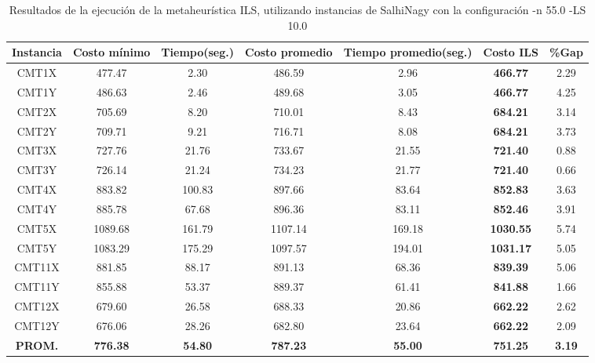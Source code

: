 \begin{table}[ht]
\caption{Resultados de la ejecución de la metaheurística ILS, utilizando instancias de SalhiNagy con la configuración -n 55.0 -LS 10.0}
\centering
\small
\begin{tabular}{c c c c c c c}
\hline\hline
Instancia & Costo mínimo & Tiempo(seg.) & Costo promedio & Tiempo promedio(seg.) & Costo ILS & \%Gap \\ [0.5ex]
\hline
CMT1X & 477.47 & 2.30 & 
486.59 & 2.96 & \bf{466.77} & 
2.29\\CMT1Y & 486.63 & 2.46 & 
489.68 & 3.05 & \bf{466.77} & 
4.25\\CMT2X & 705.69 & 8.20 & 
710.01 & 8.43 & \bf{684.21} & 
3.14\\CMT2Y & 709.71 & 9.21 & 
716.71 & 8.08 & \bf{684.21} & 
3.73\\CMT3X & 727.76 & 21.76 & 
733.67 & 21.55 & \bf{721.40} & 
0.88\\CMT3Y & 726.14 & 21.24 & 
734.23 & 21.77 & \bf{721.40} & 
0.66\\CMT4X & 883.82 & 100.83 & 
897.66 & 83.64 & \bf{852.83} & 
3.63\\CMT4Y & 885.78 & 67.68 & 
896.36 & 83.11 & \bf{852.46} & 
3.91\\CMT5X & 1089.68 & 161.79 & 
1107.14 & 169.18 & \bf{1030.55} & 
5.74\\CMT5Y & 1083.29 & 175.29 & 
1097.57 & 194.01 & \bf{1031.17} & 
5.05\\CMT11X & 881.85 & 88.17 & 
891.13 & 68.36 & \bf{839.39} & 
5.06\\CMT11Y & 855.88 & 53.37 & 
889.37 & 61.41 & \bf{841.88} & 
1.66\\CMT12X & 679.60 & 26.58 & 
688.33 & 20.86 & \bf{662.22} & 
2.62\\CMT12Y & 676.06 & 28.26 & 
682.80 & 23.64 & \bf{662.22} & 
2.09\\\bf{PROM.} & 
\bf{776.38} & \bf{54.80} & \bf{787.23} & \bf{55.00} & \bf{751.25} & \bf{3.19}\\[1ex]\hline
\end{tabular}
\label{table:nonlin}
\end{table} \clearpage
